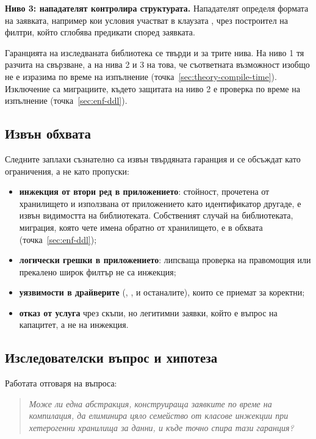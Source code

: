 \textbf{Ниво 3: нападателят контролира структурата.} Нападателят определя формата
на заявката, например кои условия участват в клаузата , чрез
построител на филтри, който сглобява предикати според заявката.

Гаранцията на изследваната библиотека се твърди и за трите нива. На ниво 1 тя
разчита на свързване, а на нива 2 и 3 на това, че съответната възможност
изобщо не е изразима по време на изпълнение (точка~\ref{sec:theory-compile-time}).
Изключение са миграциите, където защитата на ниво 2 е проверка по време на
изпълнение (точка~\ref{sec:enf-ddl}).

\subsection{Извън обхвата}
\label{sec:tm-scope}

Следните заплахи съзнателно са извън твърдяната гаранция и се обсъждат като
ограничения, а не като пропуски:

\begin{itemize}
    \item \textbf{инжекция от втори ред в приложението}: стойност, прочетена от
          хранилището и използвана от приложението като идентификатор другаде, е
          извън видимостта на библиотеката. Собственият случай на библиотеката,
          миграция, която чете имена обратно от хранилището, е в обхвата
          (точка~\ref{sec:enf-ddl});
    \item \textbf{логически грешки в приложението}: липсваща проверка на
          правомощия или прекалено широк филтър не са инжекция;
    \item \textbf{уязвимости в драйверите} (, ,
           и останалите), които се приемат за коректни;
    \item \textbf{отказ от услуга} чрез скъпи, но легитимни заявки, който е
          въпрос на капацитет, а не на инжекция.
\end{itemize}

\subsection{Изследователски въпрос и хипотеза}
\label{sec:tm-question}

Работата отговаря на въпроса:

\begin{quote}
\textit{Може ли една абстракция, конструираща заявките по време на компилация, да
елиминира цяло семейство от класове инжекции при хетерогенни хранилища за
данни, и къде точно спира тази гаранция?}
\end{quote}

